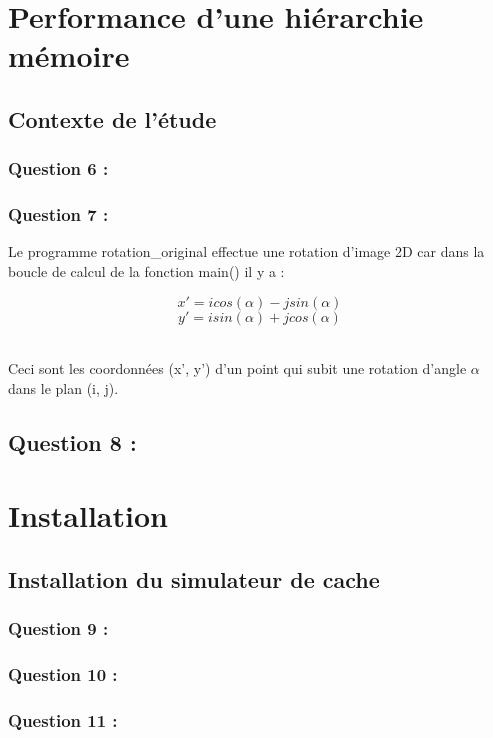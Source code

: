 \documentclass[11pt,a4paper]{article}
\begin{document}
\section{Performance d’une hiérarchie mémoire}
    \subsection{Contexte de l’étude}
        \subsubsection{Question 6 :}
        
        \subsubsection{Question 7 :}
        
Le programme rotation\_original effectue une rotation d’image 2D car dans la boucle de calcul de la fonction main() il y a :
\begin{center}
    \[x' = icos(\alpha ) - jsin(\alpha )\]
    \[y' = isin(\alpha ) + jcos(\alpha )\]
\end{center}
\\
Ceci sont les coordonnées (x', y') d'un point qui subit une rotation d'angle $\alpha$ dans le plan (i, j).

        \subsection{Question 8 :}
        
\section{Installation}
    \subsection{ Installation du simulateur de cache}
        \subsubsection{Question 9 :}
        
        \subsubsection{Question 10 :}
        
        \subsubsection{Question 11 :}
        
\end{document}
